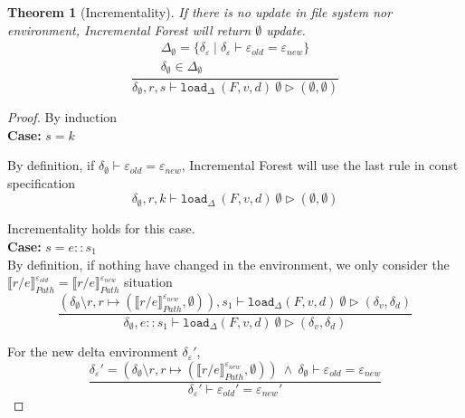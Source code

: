 \documentclass[10pt,twoside,a4paper]{article}
\theoremstyle{theorem}
\newtheorem{theorem}{Theorem}[section]
\theoremstyle{lemma}
\theoremstyle{property}
\theoremstyle{definition}
\theoremstyle{assumption}
\begin{document}
\begin{theorem}[Incrementality]
If there is no update in file system nor environment, Incremental Forest will return $\emptyset$ update.
\begin{displaymath}
\frac{\begin{array}{c}
	\Delta_{\emptyset} = \{\delta_\varepsilon \mid \delta_\varepsilon \vdash \varepsilon_{old} = \varepsilon_{new}\} \\
	\delta_{\emptyset} \in \Delta_{\emptyset}
\end{array}}
	{\delta_{\emptyset}, r, s \vdash \mathtt{load}_\Delta~ (F,v,d)~ \emptyset \rhd (\emptyset, \emptyset)}
\end{displaymath}

\end{theorem}

\begin{proof}
	By induction\\

	\textbf{Case: } $s = k$
		
		By definition, if $\delta_{\emptyset} \vdash \varepsilon_{old} = \varepsilon_{new}$, Incremental Forest will use the last rule in const specification
		\begin{displaymath}
			\delta_{\emptyset}, r, k \vdash \mathtt{load}_\Delta~ (F,v,d)~ \emptyset \rhd (\emptyset, \emptyset)
		\end{displaymath}

		Incrementality holds for this case.\\

	\textbf{Case: } $s = e::s_1$\\
	
		By definition, if nothing have changed in the environment, we only consider the $\llbracket r/e \rrbracket^{\varepsilon_{old}}_{Path} = \llbracket r/e \rrbracket^{\varepsilon_{new}}_{Path}$ situation
		\begin{displaymath}
		\frac
		{(\delta_{\emptyset} \setminus r, r \mapsto (\llbracket r/e \rrbracket^{\varepsilon_{new}}_{Path}, \emptyset)) , s_1 \vdash \mathtt{load}_\Delta (F,v,d)~ \emptyset \rhd (\delta_v,\delta_d)}
		{\delta_{\emptyset}, e::s_1 \vdash \mathtt{load}_\Delta (F,v,d)~ \emptyset \rhd (\delta_v,\delta_d)}
		\end{displaymath}

		For the new delta environment $\delta_\varepsilon'$,
		\begin{displaymath}
		\frac{
			\delta_\varepsilon' = (\delta_{\emptyset} \setminus r, r \mapsto (\llbracket r/e \rrbracket^{\varepsilon_{new}}_{Path}, \emptyset)) 
			~\wedge~ \delta_{\emptyset} \vdash \varepsilon_{old} = \varepsilon_{new}
		}
		{	\delta_\varepsilon' \vdash \varepsilon_{old}' = \varepsilon_{new}' }
		\end{displaymath}


\end{proof}
\end{document}
